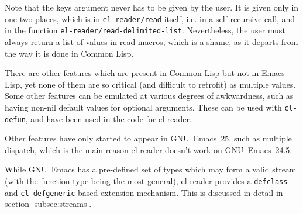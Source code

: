 \documentclass[a4paper,10pt,twoside]{report}
\newcommand{\el}{Emacs Lisp}
\newcommand{\cl}{Common Lisp}
\newcommand{\elr}{el-reader}
\newcommand{\fun}[1]{\texttt{#1}}
\newcommand{\emacs}{GNU~Emacs}
\newcommand{\emacsv}[1]{GNU~Emacs~#1}
\begin{document}
Note that the keys argument never has to be given by the user.  It is given only
in one two places, which is in \fun{el-reader/read} itself, i.e. in a
self-recursive call, and in the function \fun{el-reader/read-delimited-list}.
Nevertheless, the user must always return a list of values in read macros, which
is a shame, as it departs from the way it is done in \cl{}.

There are other features which are present in \cl{} but not in \el{}, yet none
of them are so critical (and difficult to retrofit) as multiple values.  Some
other features can be emulated at various degrees of awkwardness, such as having
non-nil default values for optional arguments.  These can be used with
\fun{cl-defun}, and have been used in the code for \elr{}.

Other features have only started to appear in \emacsv{25}, such as multiple
dispatch, which is the main reason \elr{} doesn’t work on \emacsv{24.5}.

While \emacs{} has a pre-defined set of types which may form a valid stream
(with the function type being the most general), \elr{} provides a
\fun{defclass} and \fun{cl-defgeneric} based extension mechanism.  This is
discussed in detail in section \ref{subsec:streams}.




\end{document}
